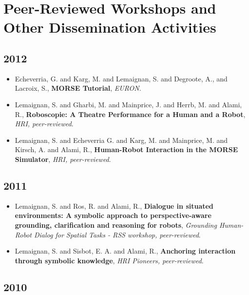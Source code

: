 \section{Peer-Reviewed Workshops and Other Dissemination Activities}

\subsection {2012}

\begin{itemize}
    \item{Echeverria, G. and Karg, M. and Lemaignan, S. and Degroote, A., and Lacroix, S., \textbf{MORSE Tutorial}, \textit{EURON}.}
    \item{Lemaignan, S. and Gharbi, M. and Mainprice, J. and Herrb, M. and Alami, R., \textbf{Roboscopie: A Theatre Performance for a Human and a Robot}, \textit{HRI, peer-reviewed}.}
    \item{Lemaignan, S. and Echeverria G. and Karg, M. and Mainprice, M. and Kirsch, A. and Alami, R., \textbf{Human-Robot Interaction in the MORSE Simulator}, \textit{HRI, peer-reviewed}.}
\end{itemize}

\subsection {2011}

\begin{itemize}
    \item{Lemaignan, S. and Ros, R. and Alami, R., \textbf{Dialogue in situated environments: A symbolic approach to perspective-aware grounding, clarification and reasoning for robots}, \textit{Grounding Human-Robot Dialog for Spatial Tasks - RSS workshop, peer-reviewed}.}
    \item{Lemaignan, S. and Sisbot, E. A. and Alami, R., \textbf{Anchoring interaction through symbolic knowledge}, \textit{HRI Pioneers, peer-reviewed}.}
\end{itemize}

\subsection {2010}

